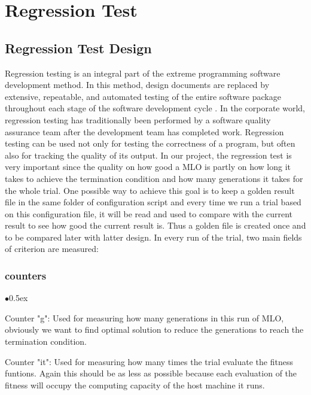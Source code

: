 \documentclass[11pt, runningheads,a4paper]{llncs}
\begin{document}
\section{Regression Test}
\subsection{Regression Test Design}
Regression testing is an integral part of the extreme programming software development method. In this method, design documents are replaced by extensive, repeatable, and automated testing of the entire software package throughout each stage of the software development cycle \cite{regression}. In the corporate world, regression testing has traditionally been performed by a software quality assurance team after the development team has completed work.
Regression testing can be used not only for testing the correctness of a program, but often also for tracking the quality of its output. In our project, the regression test is very important since the quality on how good a MLO is partly on how long it takes to achieve the termination condition and how many generations it takes for the whole trial. One possible way to achieve this goal is to keep a golden result file in the same folder of configuration script and every time we run a trial based on this configuration file, it will be read and used to compare with the current result to see how good the current result is. Thus a golden file is created once and to be compared later with latter design. In every run of the trial, two main fields of criterion are measured:
\subsubsection{counters}
\begin{list}{$\bullet$}{\itemsep 0.5ex}
\item Counter "g": Used for measuring how many generations in this run of MLO, obviously we want to find optimal solution to reduce the generations to reach the termination condition.
\item Counter "it": Used for measuring how many times the trial evaluate the fitness funtions. Again this should be as less as possible because each evaluation of the fitness will occupy the computing capacity of the host machine it runs. 

\end{list}
\end{document}
